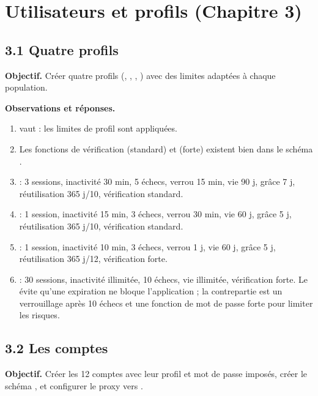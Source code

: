 \section{Utilisateurs et profils (Chapitre 3)}

\subsection{3.1 Quatre profils}
\textbf{Objectif.} Créer quatre profils (, , , ) avec des limites adaptées à chaque population.


\textbf{Observations et réponses.}
\begin{enumerate}
  \item {} vaut  : les limites de profil sont appliquées.
  \item Les fonctions de vérification  (standard) et  (forte) existent bien dans le schéma .
  \item {} : 3 sessions, inactivité 30 min, 5 échecs, verrou 15 min, vie 90 j, grâce 7 j, réutilisation 365 j/10, vérification standard.
  \item {} : 1 session, inactivité 15 min, 3 échecs, verrou 30 min, vie 60 j, grâce 5 j, réutilisation 365 j/10, vérification standard.
  \item {} : 1 session, inactivité 10 min, 3 échecs, verrou 1 j, vie 60 j, grâce 5 j, réutilisation 365 j/12, vérification forte.
  \item {} : 30 sessions, inactivité illimitée, 10 échecs, vie illimitée, vérification forte. Le  évite qu'une expiration ne bloque l'application ; la contrepartie est un verrouillage après 10 échecs et une fonction de mot de passe forte pour limiter les risques.
\end{enumerate}

\subsection{3.2 Les comptes}
\textbf{Objectif.} Créer les 12 comptes avec leur profil et mot de passe imposés, créer le schéma , et configurer le proxy  vers .


